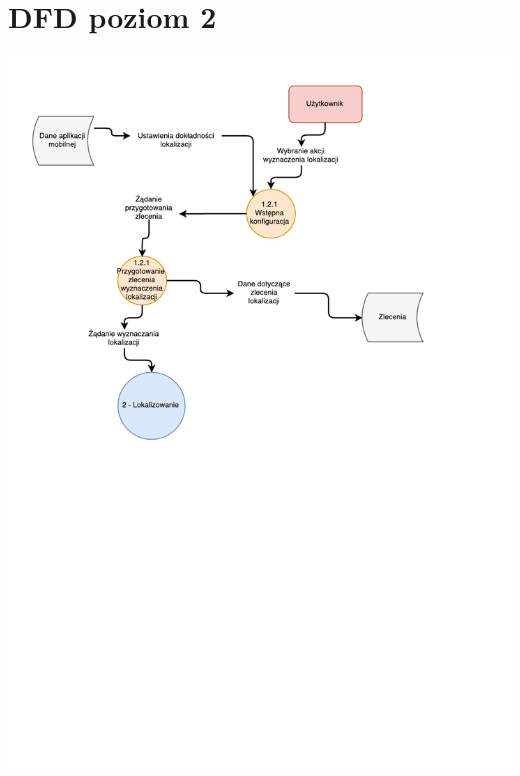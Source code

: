 \documentclass[11pt]{article}
\begin{document}
	\section{DFD poziom 2}
	\begin{center}
		\includegraphics[scale=0.8]{DFD12.pdf}
	\end{center}
	\newpage
\end{document}
